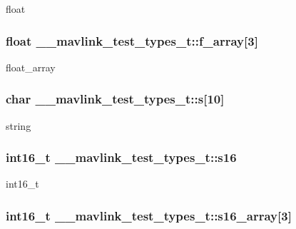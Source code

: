 float 

\hypertarget{struct____mavlink__test__types__t_af5e47188c3007e37bd07c0dd20369f26}{
\subsubsection[{f\+\_\+array}]{\setlength{\rightskip}{0pt plus 5cm}float \+\_\+\+\_\+mavlink\+\_\+test\+\_\+types\+\_\+t\+::f\+\_\+array\mbox{[}3\mbox{]}}}\label{struct____mavlink__test__types__t_af5e47188c3007e37bd07c0dd20369f26}


float\+\_\+array 

\hypertarget{struct____mavlink__test__types__t_a19c9d24689584a846d513309d740277c}{
\subsubsection[{s}]{\setlength{\rightskip}{0pt plus 5cm}char \+\_\+\+\_\+mavlink\+\_\+test\+\_\+types\+\_\+t\+::s\mbox{[}10\mbox{]}}}\label{struct____mavlink__test__types__t_a19c9d24689584a846d513309d740277c}


string 

\hypertarget{struct____mavlink__test__types__t_a6ab0cae6642964ca13fbf64709b164d0}{
\subsubsection[{s16}]{\setlength{\rightskip}{0pt plus 5cm}int16\+\_\+t \+\_\+\+\_\+mavlink\+\_\+test\+\_\+types\+\_\+t\+::s16}}\label{struct____mavlink__test__types__t_a6ab0cae6642964ca13fbf64709b164d0}


int16\+\_\+t 

\hypertarget{struct____mavlink__test__types__t_a1218c63f7bc63ab9d6acb081ffe7f25f}{
\subsubsection[{s16\+\_\+array}]{\setlength{\rightskip}{0pt plus 5cm}int16\+\_\+t \+\_\+\+\_\+mavlink\+\_\+test\+\_\+types\+\_\+t\+::s16\+\_\+array\mbox{[}3\mbox{]}}}\label{struct____mavlink__test__types__t_a1218c63f7bc63ab9d6acb081ffe7f25f}


